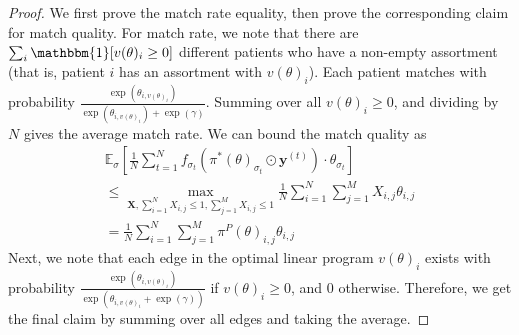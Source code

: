 \documentclass[11pt]{article}
\begin{document}
\thmmnlmatch*
\begin{proof}
     We first prove the match rate equality, then prove the corresponding claim for match quality. 
    For match rate, we note that there are $\sum_{i} \mathbbm{1}[v(\theta)_{i} \geq 0]$ different patients who have a non-empty assortment (that is, patient $i$ has an assortment with $v(\theta)_{i}$). 
    Each patient matches with probability $\frac{\exp(\theta_{i,v(\theta)_{i}})}{\exp(\theta_{i,v(\theta)_{i}}) + \exp(\gamma)}$. 
    Summing over all $v(\theta)_{i} \geq 0$, and dividing by $N$ gives the average match rate. 
    We can bound the match quality as 
    {\small \begin{align}
        \mathbb{E}_{\sigma}[\frac{1}{N} \sum_{t=1}^{N} f_{\sigma_{t}}\left(\pi^{*}(\theta)_{\sigma_{t}} \odot \mathbf{y}^{(t)}\right)  \cdot \theta_{\sigma_{t}}] \\ \leq \max\limits_{\mathbf{X}, \sum_{i=1}^{N} X_{i,j} \leq 1, \sum_{j=1}^{M} X_{i,j} \leq 1} \frac{1}{N} \sum_{i=1}^{N} \sum_{j=1}^{M} X_{i,j} \theta_{i,j} \\ = \frac{1}{N} \sum_{i=1}^{N} \sum_{j=1}^{M} \pi^{P}(\theta)_{i,j} \theta_{i,j}
    \end{align}}
    Next, we note that each edge in the optimal linear program $v(\theta)_{i}$ exists with probability $\frac{\exp(\theta_{i,v(\theta)_{i}})}{\exp(\theta_{i,v(\theta)_{i}} + \exp(\gamma))}$ if $v(\theta)_{i} \geq 0$, and $0$ otherwise. 
    Therefore, we get the final claim by summing over all edges and taking the average. 
\end{proof}
\end{document}
